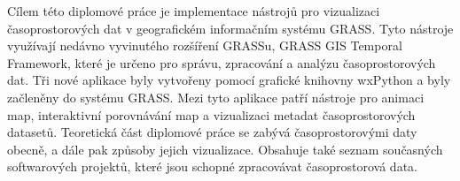 \begin{mtabstract}[Abstrakt]

Cílem této diplomové práce je implementace nástrojů pro vizualizaci
časo\-pros\-toro\-vých dat v geografickém informačním systému GRASS.
Tyto nástroje využívají nedávno vyvinutého rozšíření GRASSu,
GRASS GIS Temporal Framework, které je určeno pro správu, zpracování a analýzu
časoprostorových dat. Tři nové aplikace byly
vytvořeny pomocí grafické knihovny wxPython a byly začleněny do systému GRASS.
Mezi tyto aplikace patří nástroje pro animaci map, interaktivní porovnávání map
a vizualizaci metadat časoprostorových datasetů.
Teoretická část diplomové práce se zabývá časoprostorovými daty obecně,
a dále pak způsoby jejich vizualizace. Obsahuje také seznam současných softwarových
projektů, které jsou schopné zpracovávat časoprostorová data.


\bigskip
\bigskip
\bigskip
\bigskip


\end{mtabstract}

